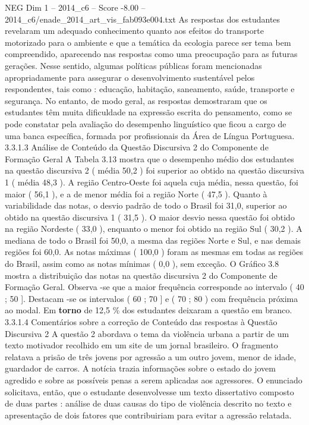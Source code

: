 \begin{textsample}{NEG Dim 1 – 2014\_c6 – Score -8.00 – 2014\_c6/enade\_2014\_art\_vis\_fab093e004.txt}
As respostas dos estudantes revelaram um adequado conhecimento quanto aos efeitos do transporte motorizado para o ambiente e que a temática da ecologia parece ser tema bem compreendido, aparecendo nas respostas como uma preocupação para as futuras gerações.
Nesse sentido, algumas políticas públicas foram mencionadas apropriadamente para assegurar o desenvolvimento sustentável pelos respondentes, tais como : educação, habitação, saneamento, saúde, transporte e segurança.
No entanto, de modo geral, as respostas demostraram que os estudantes têm muita dificuldade na expressão escrita do pensamento, como se pode constatar pela avaliação do desempenho linguístico que ficou a cargo de uma banca específica, formada por profissionais da Área de Língua Portuguesa. 3.3.1.3 Análise de Conteúdo da Questão Discursiva 2 do Componente de Formação Geral A Tabela 3.13 mostra que o desempenho médio dos estudantes na questão discursiva 2 ( média 50,2 ) foi superior ao obtido na questão discursiva 1 ( média 48,3 ).
A região Centro-Oeste foi aquela cuja média, nessa questão, foi maior ( 56,1 ), e a de menor média foi a região Norte ( 47,5 ).
Quanto à variabilidade das notas, o desvio padrão de todo o Brasil foi 31,0, superior ao obtido na questão discursiva 1 ( 31,5 ).
O maior desvio nessa questão foi obtido na região Nordeste ( 33,0 ), enquanto o menor foi obtido na região Sul ( 30,2 ).
A mediana de todo o Brasil foi 50,0, a mesma das regiões Norte e Sul, e nas demais regiões foi 60,0.
As notas máximas ( 100,0 ) foram as mesmas em todas as regiões do Brasil, assim como as notas mínimas ( 0,0 ), sem exceção.
O Gráfico 3.8 mostra a distribuição das notas na questão discursiva 2 do Componente de Formação Geral.
Observa -se que a maior frequência corresponde ao intervalo ( 40 ; 50 ].
Destacam -se os intervalos ( 60 ; 70 ] e ( 70 ; 80 ) com frequência próxima ao modal.
Em \textbf{torno} de 12,5 \% dos estudantes deixaram a questão em branco. 3.3.1.4 Comentários sobre a correção de Conteúdo das respostas à Questão Discursiva 2 A questão 2 abordava o tema da violência urbana a partir de um texto motivador recolhido em um site de um jornal brasileiro.
O fragmento relatava a prisão de três jovens por agressão a um outro jovem, menor de idade, guardador de carros.
A notícia trazia informações sobre o estado do jovem agredido e sobre as possíveis penas a serem aplicadas aos agressores.
O enunciado solicitava, então, que o estudante desenvolvesse um texto dissertativo composto de duas partes : análise de duas causas do tipo de violência descrito no texto e apresentação de dois fatores que contribuiriam para evitar a agressão relatada.

\end{textsample}
